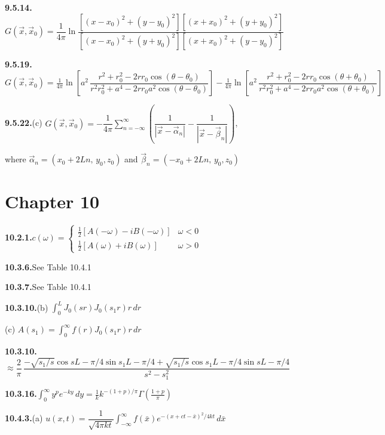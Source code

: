\medskip
\textbf{9.5.14.}\quad $G(\vec{x},\vec{x}_0) = \dfrac{1}{4\pi}\ln\dfrac{[(x-x_0)^2+(y-y_0)^2][(x+x_0)^2+(y+y_0)^2]}{[(x-x_0)^2+(y+y_0)^2][(x+x_0)^2+(y-y_0)^2]}$%

\medskip
\textbf{9.5.19.}\quad $G(\vec{x},\vec{x}_0) = \frac{1}{4\pi}\ln\left[a^2\,\dfrac{r^2+r_0^2-2rr_0\cos(\theta-\theta_0)}{r^2r_0^2+a^4-2rr_0a^2\cos(\theta-\theta_0)}\right]-\frac{1}{4\pi}\ln\left[a^2\,\dfrac{r^2+r_0^2-2rr_0\cos(\theta+\theta_0)}{r^2r_0^2+a^4-2rr_0a^2\cos(\theta+\theta_0)}\right]$%

\medskip
\textbf{9.5.22.}\quad (c) $G(\vec{x},\vec{x}_0) = -\dfrac{1}{4\pi}\sum_{n=-\infty}^{\infty}\left(\dfrac{1}{|\vec{x}-\vec{\alpha}_n|}-\dfrac{1}{|\vec{x}-\vec{\beta}_n|}\right)$,

where $\vec{\alpha}_n = (x_0+2Ln,\,y_0,z_0)$ and $\vec{\beta}_n = (-x_0+2Ln,\,y_0,z_0)$

\section*{Chapter 10}

\textbf{10.2.1.}\quad $c(\omega) = \begin{cases}\frac{1}{2}[A(-\omega)-iB(-\omega)] & \omega < 0 \\[4pt] \frac{1}{2}[A(\omega)+iB(\omega)] & \omega > 0\end{cases}$

\medskip
\textbf{10.3.6.}\quad See Table 10.4.1

\medskip
\textbf{10.3.7.}\quad See Table 10.4.1

\medskip
\textbf{10.3.10.}\quad (b) $\int_0^L J_0(sr)J_0(s_1 r)r\,dr$

\quad (c) $A(s_1) = \int_0^{\infty}f(r)J_0(s_1 r)r\,dr$

\medskip
\textbf{10.3.10.}\quad $\approx \dfrac{2}{\pi}\,\dfrac{-\sqrt{s_1/s}\cos sL-\pi/4\sin s_1 L-\pi/4+\sqrt{s_1/s}\cos s_1 L-\pi/4\sin sL-\pi/4}{s^2-s_1^2}$%

\medskip
\textbf{10.3.16.}\quad $\int_0^{\infty}y^p e^{-ky}\,dy = \frac{1}{k}k^{-(1+p)/\pi}\Gamma\!\left(\frac{1+p}{\pi}\right)$%

\medskip
\textbf{10.4.3.}\quad (a) $u(x,t) = \dfrac{1}{\sqrt{4\pi kt}}\int_{-\infty}^{\infty}f(\bar{x})e^{-(x+ct-\bar{x})^2/4kt}\,d\bar{x}$

